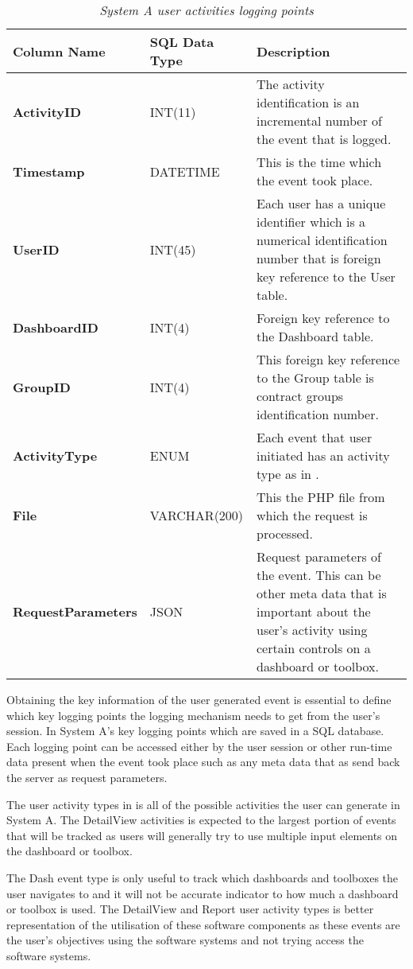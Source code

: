 \begin{table}[!htb]
	\centering
	\small
	\caption[System A user activities logging points]
	{\textit{System A user activities logging points}}
	\label{tbl:Ch2_System_A_Logging_Points}
	\begin{tabularx}{\textwidth}{|l|l|X|}
		\hline \textbf{Column Name} & \textbf{SQL Data Type} & \textbf{Description} \\
		\hline \textbf{ActivityID} & INT(11) & The activity identification is an incremental number of the event that is logged.\\
		\hline \textbf{Timestamp} & DATETIME & This is the time which the event took place.\\
		\hline \textbf{UserID} & INT(45) & Each user has a unique identifier which is a numerical identification number that is foreign key reference to the User table.\\
		\hline \textbf{DashboardID} & INT(4) & Foreign key reference to the Dashboard table. \\
		\hline \textbf{GroupID} & INT(4) & This foreign key reference to the Group table is contract groups identification number. \\ 		
		\hline \textbf{ActivityType} & ENUM & Each event that user initiated has an activity type as in \Cref{tbl:Ch2_SystemA_EventTypes}. \\
		\hline \textbf{File} & VARCHAR(200) & This the PHP file from which the request is processed.\\
		\hline \textbf{RequestParameters} & JSON & Request parameters of the event. This can be other meta data that is important about the user's activity using certain controls on a dashboard or toolbox. \\
		\hline
	\end{tabularx}
\end{table}

\clearpage

Obtaining the key information of the user generated event is essential to define which key logging points the logging mechanism needs to get from the user's session. In  System A's key logging points which are saved in a SQL database. Each logging point can be accessed either by the user session or other run-time data present when the event took place such as any meta data that as send back the server as request parameters.

The user activity types in  is all of the possible activities the user can generate in System A. The DetailView activities is expected to the largest portion of events that will be tracked as users will generally try to use multiple input elements on the dashboard or toolbox. \par The Dash event type is only useful to track which dashboards and toolboxes the user navigates to and it will not be accurate indicator to how much a dashboard or toolbox is used. The DetailView and Report user activity types is better representation of the utilisation of these software components as these events are the user's objectives using the software systems and not trying access the software systems.  

